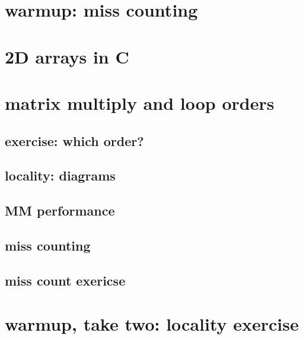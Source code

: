 \section{warmup: miss counting}


\section{2D arrays in C}



\section{matrix multiply and loop orders}

%


\subsection{exercise: which order?}

\subsection{locality: diagrams}



\subsection{MM performance}


\subsection{miss counting}


\subsection{miss count exericse}


\section{warmup, take two: locality exercise}


